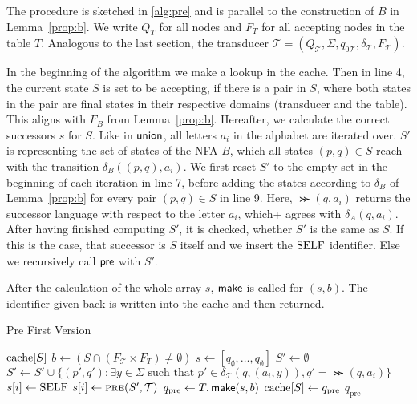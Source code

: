 The procedure is sketched in \autoref{alg:pre} and is parallel to the construction of $B$ in Lemma~\ref{prop:b}. We write $Q_{T}$ for all nodes and $F_{T}$ for all accepting nodes in the table $T$. Analogous to the last section, the transducer $\mathcal{T} = (Q_{\mathcal{T}},\Sigma,q_{0\mathcal{T}},\delta_{\mathcal{T}},F_{\mathcal{T}})$.
\par 
In the beginning of the algorithm we make a lookup in the cache. 
Then in line 4, the current state $S$ is set to be accepting, if there is a pair in $S$, where both states in the pair are final states in their respective domains (transducer and the table). This aligns with $F_{B}$ from Lemma~\ref{prop:b}. 
Hereafter, we calculate the correct successors $s$ for $S$. Like in $\operatorname{\textsf{union}}$, all letters $a_{i}$ in the alphabet are iterated over. $S'$ is representing the set of states of the NFA $B$, which all states $(p,q) \in S$ reach with the transition $\delta_{B}((p,q),a_{i})$. We first reset $S'$ to the empty set in the beginning of each iteration in line 7, before adding the states according to $\delta_{B}$ of Lemma~\ref{prop:b} for every pair $(p,q) \in S$ in line 9. Here, $\Succ(q,a_{i})$ returns the successor language with respect to the letter $a_{i}$, which+ agrees with $\delta_{A}(q,a_{i})$. 
After having finished computing $S'$, it is checked, whether $S'$ is the same as $S$. If this is the case, that successor is $S$ itself and we insert the $\mathrm{SELF}$ identifier. Else we recursively call $\operatorname{\textsf{pre}}$ with $S'$. 
\par

After the calculation of the whole array $s$, $\operatorname{\textsf{make}}$ is called for $(s,b)$. The identifier given back is written into the cache and then returned. 

\begin{algorithm}
\caption{Pre First Version}\label{alg:pre0}
\begin{algorithmic}[1]
\If{$\cache[S]$}
\Return $\cache[S]$
\EndIf
\State $b \gets (S \cap (F_{\mathcal{T}} \times F_{T} ) \neq \emptyset)$
\State $s \gets [q_{\emptyset},\dots,q_{\emptyset}]$
\State $S' \gets \emptyset$
\State $S' \gets S' \cup \{(p',q'): \exists y \in \Sigma \text{ such that } p' \in \delta_{\mathcal{T}}(q,(a_{i},y)), q' = \Succ(q,a_{i})\}$
\EndFor
{}
\State $s[i] \gets \mathrm{SELF}$
\Else
\State $s[i] \gets \Call{pre}{S',\mathcal{T}}$
\EndIf
\EndFor
\State $q_{\text{pre}} \gets T.\operatorname{\textsf{make}}(s,b)$
\State $\mathrm{cache}[S] \gets q_{\text{pre}}$
\Return $q_{\text{pre}} $
\EndProcedure
\end{algorithmic}
\end{algorithm}

